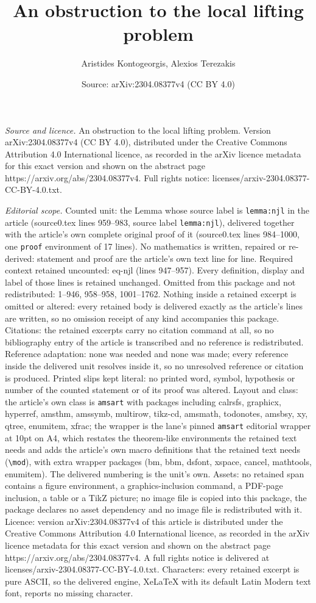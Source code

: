 \documentclass[10pt,a4paper]{amsart}
\title[An obstruction to the local lifting problem]{An obstruction to the local lifting problem}
\author{Aristides Kontogeorgis, Alexios Terezakis}
\date{Source: arXiv:2304.08377v4 (CC BY 4.0)}
\begin{document}
\maketitle

\noindent\emph{Source and licence.} An obstruction to the local lifting problem. Version arXiv:2304.08377v4 (CC BY 4.0), distributed under the Creative Commons Attribution 4.0 International licence, as recorded in the arXiv licence metadata for this exact version and shown on the abstract page https://arxiv.org/abs/2304.08377v4. Full rights notice: licenses/arxiv-2304.08377-CC-BY-4.0.txt.\par\smallskip

\noindent\textit{Editorial scope.} Counted unit: the Lemma whose source label is \texttt{lemma:njl} in the article (source0.tex lines 959--983, source label \texttt{lemma:njl}), delivered together with the article's own complete original proof of it (source0.tex lines 984--1000, one \texttt{proof} environment of 17 lines). No mathematics is written, repaired or re-derived: statement and proof are the article's own text line for line. Required context retained uncounted: eq-njl (lines 947--957). Every definition, display and label of those lines is retained unchanged. Omitted from this package and not redistributed: 1--946, 958--958, 1001--1762. Nothing inside a retained excerpt is omitted or altered: every retained body is delivered exactly as the article's lines are written, so no omission receipt of any kind accompanies this package. Citations: the retained excerpts carry no citation command at all, so no bibliography entry of the article is transcribed and no reference is redistributed. Reference adaptation: none was needed and none was made; every reference inside the delivered unit resolves inside it, so no unresolved reference or citation is produced. Printed slips kept literal: no printed word, symbol, hypothesis or number of the counted statement or of its proof was altered. Layout and class: the article's own class is \texttt{amsart} with packages including calrsfs, graphicx, hyperref, amsthm, amssymb, multirow, tikz-cd, amsmath, todonotes, amsbsy, xy, qtree, enumitem, xfrac; the wrapper is the lane's pinned \texttt{amsart} editorial wrapper at 10pt on A4, which restates the theorem-like environments the retained text needs and adds the article's own macro definitions that the retained text needs (\texttt{\textbackslash mod}), with extra wrapper packages (bm, bbm, dsfont, xspace, cancel, mathtools, enumitem). The delivered numbering is the unit's own. Assets: no retained span contains a figure environment, a graphics-inclusion command, a PDF-page inclusion, a table or a TikZ picture; no image file is copied into this package, the package declares no asset dependency and no image file is redistributed with it. Licence: version arXiv:2304.08377v4 of this article is distributed under the Creative Commons Attribution 4.0 International licence, as recorded in the arXiv licence metadata for this exact version and shown on the abstract page https://arxiv.org/abs/2304.08377v4. A full rights notice is delivered at licenses/arxiv-2304.08377-CC-BY-4.0.txt. Characters: every retained excerpt is pure ASCII, so the delivered engine, XeLaTeX with its default Latin Modern text font, reports no missing character.
\end{document}
